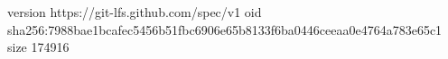 version https://git-lfs.github.com/spec/v1
oid sha256:7988bae1bcafec5456b51fbc6906e65b8133f6ba0446ceeaa0e4764a783e65c1
size 174916
